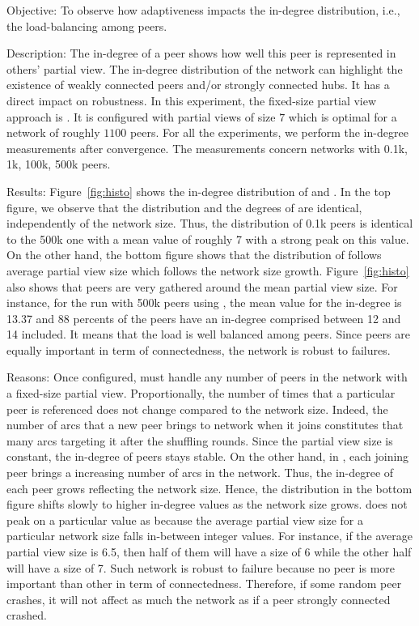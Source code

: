 \begin{asparadesc}
\item[Objective:] To observe how adaptiveness impacts the in-degree
  distribution, i.e., the load-balancing among peers.
\item[Description:] The in-degree of a peer shows how well this peer is
  represented in others' partial view. The in-degree distribution of the
  network can highlight the existence of weakly connected peers and/or strongly
  connected hubs. It has a direct impact on robustness. In this experiment, the
  fixed-size partial view approach is \CYCLON{}. It is configured with partial
  views of size $7$ which is optimal for a network of roughly $1100$ peers.
  For all the experiments, we perform the in-degree measurements after
  convergence. The measurements concern networks with 0.1k, 1k, 100k, 500k
  peers.
\item[Results:] Figure~\ref{fig:histo} shows the in-degree distribution of
  \CYCLON and \SPRAY. In the top figure, we observe that the distribution and
  the degrees of \CYCLON are identical, independently of the network
  size. Thus, the distribution of 0.1k peers is identical to the 500k one with
  a mean value of roughly 7 with a strong peak on this value. On the other
  hand, the bottom figure shows that the distribution of \SPRAY follows average
  partial view size which follows the network size
  growth. Figure~\ref{fig:histo} also shows that peers are very gathered around
  the mean partial view size. For instance, for the run with 500k peers using
  \SPRAY, the mean value for the in-degree is 13.37 and 88 percents of the
  peers have an in-degree comprised between 12 and 14 included. It means that
  the load is well balanced among peers. Since peers are equally important in
  term of connectedness, the network is robust to failures.
\item[Reasons:] Once configured, \CYCLON must handle any number of peers in the
  network with a fixed-size partial view. Proportionally, the number of times
  that a particular peer is referenced does not change compared to the network
  size. Indeed, the number of arcs that a new peer brings to network when it
  joins constitutes that many arcs targeting it after the shuffling
  rounds. Since the partial view size is constant, the in-degree of peers stays
  stable. On the other hand, in \SPRAY, each joining peer brings a increasing
  number of arcs in the network. Thus, the in-degree of each peer grows
  reflecting the network size. Hence, the distribution in the bottom figure
  shifts slowly to higher in-degree values as the network size grows.  \SPRAY
  does not peak on a particular value as \CYCLON because the average partial
  view size for a particular network size falls in-between integer values. For
  instance, if the average partial view size is 6.5, then half of them will
  have a size of 6 while the other half will have a size of 7. Such network is
  robust to failure because no peer is more important than other in term of
  connectedness. Therefore, if some random peer crashes, it will not affect as
  much the network as if a peer strongly connected crashed.
\end{asparadesc}


